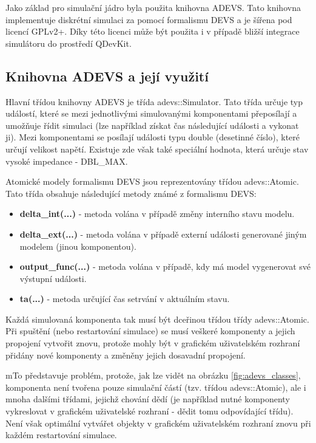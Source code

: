 Jako základ pro simulační jádro byla použita knihovna ADEVS. Tato knihovna implementuje diskrétní simulaci za pomocí formalismu DEVS a je šířena pod licencí GPLv2+. Díky této licenci může být použita i v případě bližší integrace simulátoru do prostředí QDevKit.

\subsection{Knihovna ADEVS a její využití}

Hlavní třídou knihovny ADEVS je třída adevs::Simulator. Tato třída určuje typ událostí, které se mezi jednotlivými simulovanými komponentami přeposílají a umožňuje řídit simulaci (lze například získat čas následující události a vykonat ji). Mezi komponentami se posílají události typu double (desetinné číslo),  které určují velikost napětí. Existuje zde však také speciální hodnota, která určuje stav vysoké impedance - DBL\_MAX.

Atomické modely formalismu DEVS jsou reprezentovány třídou adevs::Atomic. Tato třída obsahuje následující metody známé z formalismu DEVS:

\begin{itemize}
\item \textbf{delta\_int(...)} - metoda volána v případě změny interního stavu modelu.
\item \textbf{delta\_ext(...)} - metoda volána v případě externí události generované jiným modelem (jinou komponentou).
\item \textbf{output\_func(...)} - metoda volána v případě, kdy má model vygenerovat své výstupní události.
\item \textbf{ta(...)} - metoda určující čas setrvání v aktuálním stavu.
\end{itemize}

Každá simulovaná komponenta tak musí být dceřinou třídou třídy adevs::Atomic. Při spuštění (nebo restartování simulace) se musí veškeré komponenty a jejich propojení vytvořit znovu, protože mohly být v grafickém uživatelském rozhraní přidány nové komponenty a změněny jejich dosavadní propojení.

mTo představuje problém, protože, jak lze vidět na obrázku \ref{fig:adevs_classes}, komponenta není tvořena pouze simulační částí (tzv. třídou adevs::Atomic), ale i mnoha dalšími třídami, jejichž chování dědí (je například nutné komponenty vykreslovat v grafickém uživatelské rozhraní - dědit tomu odpovídající třídu). Není však optimální vytvářet objekty v grafickém uživatelském rozhraní znovu při každém restartování simulace.

